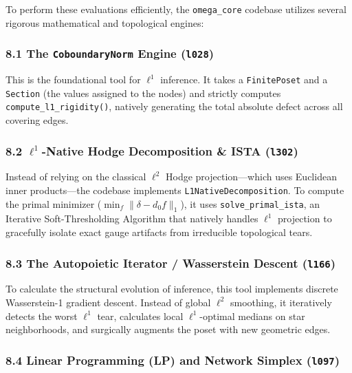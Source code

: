 \documentclass[
]{article}
\begin{document}
To perform these evaluations efficiently, the \texttt{omega\_core}
codebase utilizes several rigorous mathematical and topological engines:

\subsubsection{\texorpdfstring{8.1 The \texttt{CoboundaryNorm} Engine
(\texttt{l028})}{8.1 The CoboundaryNorm Engine (l028)}}\label{the-coboundarynorm-engine-l028}

This is the foundational tool for \(\ell^1\) inference. It takes a
\texttt{FinitePoset} and a \texttt{Section} (the values assigned to the
nodes) and strictly computes \texttt{compute\_l1\_rigidity()}, natively
generating the total absolute defect across all covering edges.

\subsubsection{\texorpdfstring{8.2 \(\ell^1\)-Native Hodge Decomposition
\& ISTA
(\texttt{l302})}{8.2 \textbackslash ell\^{}1-Native Hodge Decomposition \& ISTA (l302)}}\label{ell1-native-hodge-decomposition-ista-l302}

Instead of relying on the classical \(\ell^2\) Hodge projection---which
uses Euclidean inner products---the codebase implements
\texttt{L1NativeDecomposition}. To compute the primal minimizer
(\(\min_f \|\delta - d_0 f\|_1\)), it uses \texttt{solve\_primal\_ista},
an Iterative Soft-Thresholding Algorithm that natively handles
\(\ell^1\) projection to gracefully isolate exact gauge artifacts from
irreducible topological tears.

\subsubsection{\texorpdfstring{8.3 The Autopoietic Iterator /
Wasserstein Descent
(\texttt{l166})}{8.3 The Autopoietic Iterator / Wasserstein Descent (l166)}}\label{the-autopoietic-iterator-wasserstein-descent-l166}

To calculate the structural evolution of inference, this tool implements
discrete Wasserstein-1 gradient descent. Instead of global \(\ell^2\)
smoothing, it iteratively detects the worst \(\ell^1\) tear, calculates
local \(\ell^1\)-optimal medians on star neighborhoods, and surgically
augments the poset with new geometric edges.

\subsubsection{\texorpdfstring{8.4 Linear Programming (LP) and Network
Simplex
(\texttt{l097})}{8.4 Linear Programming (LP) and Network Simplex (l097)}}\label{linear-programming-lp-and-network-simplex-l097}
\end{document}
